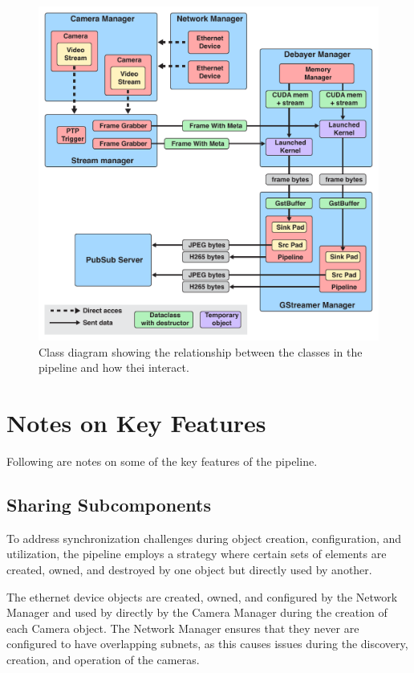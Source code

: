 \begin{figure}[H]
    \centering
    \includegraphics[width=\textwidth]{figures/object_overview.pdf}
    \caption{Class diagram showing the relationship between the classes in the pipeline and how thei interact.}
    \label{fig:object_overveiw}
\end{figure}

\section{Notes on Key Features}
Following are notes on some of the key features of the pipeline.

\subsection{Sharing Subcomponents}
To address synchronization challenges during object creation, configuration, and utilization, the pipeline employs a strategy where certain sets of elements are created, owned, and destroyed by one object but directly used by another.

The ethernet device objects are created, owned, and configured by the Network Manager and used by directly by the Camera Manager during the creation of each Camera object.
The Network Manager ensures that they never are configured to have overlapping subnets, as this causes issues during the discovery, creation, and operation of the cameras.

